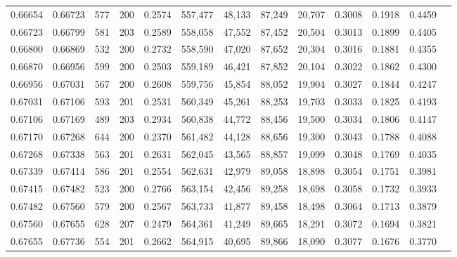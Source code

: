\begin{tabular}{rrrrrrrrrrrrr}
0.66654 & 0.66723 &   577 & 200 &                                     0.2574 & 557,477 &  48,133 &  87,249 &  20,707 & 0.3008 & 0.1918 & 0.4459 \\
0.66723 & 0.66799 &   581 & 203 &                                     0.2589 & 558,058 &  47,552 &  87,452 &  20,504 & 0.3013 & 0.1899 & 0.4405 \\
0.66800 & 0.66869 &   532 & 200 &                                     0.2732 & 558,590 &  47,020 &  87,652 &  20,304 & 0.3016 & 0.1881 & 0.4355 \\
0.66870 & 0.66956 &   599 & 200 &                                     0.2503 & 559,189 &  46,421 &  87,852 &  20,104 & 0.3022 & 0.1862 & 0.4300 \\
0.66956 & 0.67031 &   567 & 200 &                                     0.2608 & 559,756 &  45,854 &  88,052 &  19,904 & 0.3027 & 0.1844 & 0.4247 \\
0.67031 & 0.67106 &   593 & 201 &                                     0.2531 & 560,349 &  45,261 &  88,253 &  19,703 & 0.3033 & 0.1825 & 0.4193 \\
0.67106 & 0.67169 &   489 & 203 &                                     0.2934 & 560,838 &  44,772 &  88,456 &  19,500 & 0.3034 & 0.1806 & 0.4147 \\
0.67170 & 0.67268 &   644 & 200 &                                     0.2370 & 561,482 &  44,128 &  88,656 &  19,300 & 0.3043 & 0.1788 & 0.4088 \\
0.67268 & 0.67338 &   563 & 201 &                                     0.2631 & 562,045 &  43,565 &  88,857 &  19,099 & 0.3048 & 0.1769 & 0.4035 \\
0.67339 & 0.67414 &   586 & 201 &                                     0.2554 & 562,631 &  42,979 &  89,058 &  18,898 & 0.3054 & 0.1751 & 0.3981 \\
0.67415 & 0.67482 &   523 & 200 &                                     0.2766 & 563,154 &  42,456 &  89,258 &  18,698 & 0.3058 & 0.1732 & 0.3933 \\
0.67482 & 0.67560 &   579 & 200 &                                     0.2567 & 563,733 &  41,877 &  89,458 &  18,498 & 0.3064 & 0.1713 & 0.3879 \\
0.67560 & 0.67655 &   628 & 207 &                                     0.2479 & 564,361 &  41,249 &  89,665 &  18,291 & 0.3072 & 0.1694 & 0.3821 \\
0.67655 & 0.67736 &   554 & 201 &                                     0.2662 & 564,915 &  40,695 &  89,866 &  18,090 & 0.3077 & 0.1676 & 0.3770 \\

\end{tabular}
